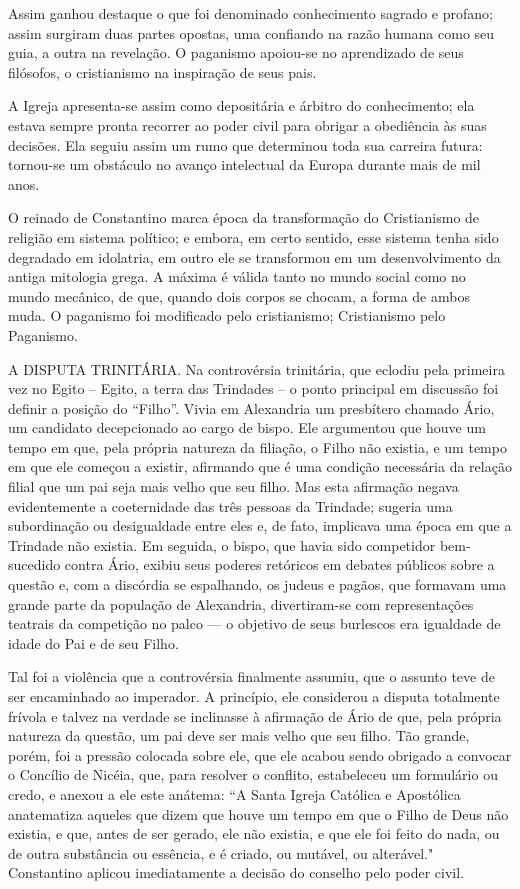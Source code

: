 \documentclass[11pt,a5paper,twoside,openany]{book}
\begin{document}
Assim ganhou destaque o que foi denominado conhecimento sagrado e profano; assim surgiram duas partes opostas, uma confiando na razão humana como seu guia, a outra na revelação. O paganismo apoiou-se no aprendizado de seus filósofos, o cristianismo na inspiração de seus pais.

A Igreja apresenta-se assim como depositária e árbitro do conhecimento; ela estava sempre pronta recorrer ao poder civil para obrigar a obediência às suas decisões. Ela seguiu assim um rumo que determinou toda sua carreira futura: tornou-se um obstáculo no avanço intelectual da Europa durante mais de mil anos.

O reinado de Constantino marca época da transformação do Cristianismo de religião em sistema político; e embora, em certo sentido, esse sistema tenha sido degradado em idolatria, em outro ele se transformou em um desenvolvimento da antiga mitologia grega. A máxima é válida tanto no mundo social como no mundo mecânico, de que, quando dois corpos se chocam, a forma de ambos muda. O paganismo foi modificado pelo cristianismo; Cristianismo pelo Paganismo.

A DISPUTA TRINITÁRIA. Na controvérsia trinitária, que eclodiu pela primeira vez no Egito – Egito, a terra das Trindades – o ponto principal em discussão foi definir a posição do “Filho”. Vivia em Alexandria um presbítero chamado Ário, um candidato decepcionado ao cargo de bispo. Ele argumentou que houve um tempo em que, pela própria natureza da filiação, o Filho não existia, e um tempo em que ele começou a existir, afirmando que é uma condição necessária da relação filial que um pai seja mais velho que seu filho. Mas esta afirmação negava evidentemente a coeternidade das três pessoas da Trindade; sugeria uma subordinação ou desigualdade entre eles e, de fato, implicava uma época em que a Trindade não existia. Em seguida, o bispo, que havia sido competidor bem-sucedido contra Ário, exibiu seus poderes retóricos em debates públicos sobre a questão e, com a discórdia se espalhando, os judeus e pagãos, que formavam uma grande parte da população de Alexandria, divertiram-se com representações teatrais da competição no palco — o objetivo de seus burlescos era igualdade de idade do Pai e de seu Filho.

Tal foi a violência que a controvérsia finalmente assumiu, que o assunto teve de ser encaminhado ao imperador. A princípio, ele considerou a disputa totalmente frívola e talvez na verdade se inclinasse à afirmação de Ário de que, pela própria natureza da questão, um pai deve ser mais velho que seu filho. Tão grande, porém, foi a pressão colocada sobre ele, que ele acabou sendo obrigado a convocar o Concílio de Nicéia, que, para resolver o conflito, estabeleceu um formulário ou credo, e anexou a ele este anátema: “A Santa Igreja Católica e Apostólica anatematiza aqueles que dizem que houve um tempo em que o Filho de Deus não existia, e que, antes de ser gerado, ele não existia, e que ele foi feito do nada, ou de outra substância ou essência, e é criado, ou mutável, ou alterável." Constantino aplicou imediatamente a decisão do conselho pelo poder civil.
\end{document}

